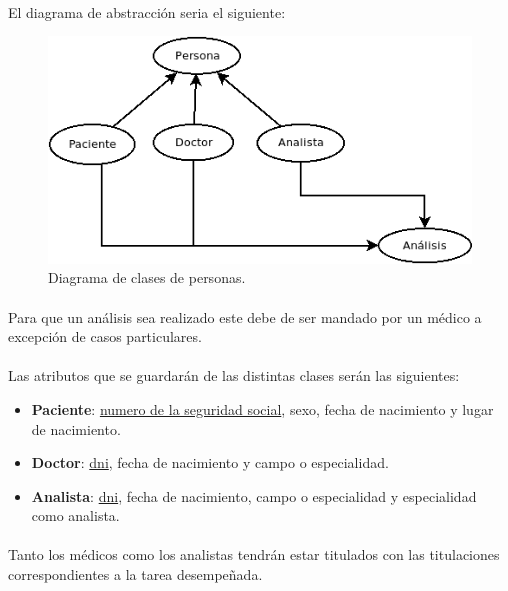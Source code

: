 \documentclass[a4paper,10pt]{article}
\begin{document}
\paragraph{}
El diagrama de abstracción seria el siguiente:
\vspace{0.5cm}
\begin{center}
	\begin{figure}[hbt]
		\includegraphics[width=\textwidth]{img/personas.png}
		\caption{Diagrama de clases de personas.}
		\label{fig:diagramapersonas}
	\end{figure}
\end{center}
\paragraph{}
Para que un análisis sea realizado este debe de ser mandado por un médico a excepción de casos particulares.
\paragraph{}
Las atributos que se guardarán de las distintas clases serán las siguientes:
\begin{itemize}
	\item {\bf Paciente}: \underline{numero de la seguridad social}, sexo, fecha de nacimiento y lugar de nacimiento.
	\item {\bf Doctor}: \underline{dni}, fecha de nacimiento y campo o especialidad.
	\item {\bf Analista}: \underline{dni}, fecha de nacimiento, campo o especialidad y especialidad como analista.
\end{itemize}
\paragraph{}
Tanto los médicos como los analistas tendrán estar titulados con las titulaciones correspondientes a la tarea desempeñada.
\end{document}
